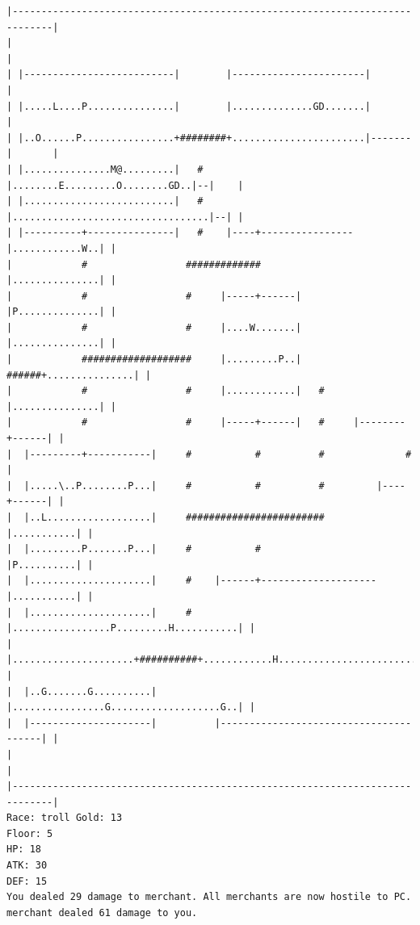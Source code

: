 \documentclass[11pt]{article}
\theoremstyle{plain}
\begin{document}
\begin{Verbatim}[fontsize=\scriptsize]
|-----------------------------------------------------------------------------|
|                                                                             |
| |--------------------------|        |-----------------------|               |
| |.....L....P...............|        |..............GD.......|               |
| |..O......P................+########+.......................|-------|       |
| |...............M@.........|   #    |........E.........O........GD..|--|    |
| |..........................|   #    |..................................|--| |
| |----------+---------------|   #    |----+----------------|............W..| |
|            #                 #############                |...............| |
|            #                 #     |-----+------|         |P..............| |
|            #                 #     |....W.......|         |...............| |
|            ###################     |.........P..|   ######+...............| |
|            #                 #     |............|   #     |...............| |
|            #                 #     |-----+------|   #     |--------+------| |
|  |---------+-----------|     #           #          #              #        |
|  |.....\..P........P...|     #           #          #         |----+------| |
|  |..L..................|     ########################         |...........| |
|  |.........P.......P...|     #           #                    |P..........| |
|  |.....................|     #    |------+--------------------|...........| |
|  |.....................|     #    |.................P.........H...........| |
|  |.....................+##########+............H..........................| |
|  |..G.......G..........|          |................G...................G..| |
|  |---------------------|          |---------------------------------------| |
|                                                                             |
|-----------------------------------------------------------------------------|
Race: troll Gold: 13                                                   Floor: 5
HP: 18
ATK: 30
DEF: 15
You dealed 29 damage to merchant. All merchants are now hostile to PC. merchant dealed 61 damage to you.
\end{Verbatim}
\end{document}
